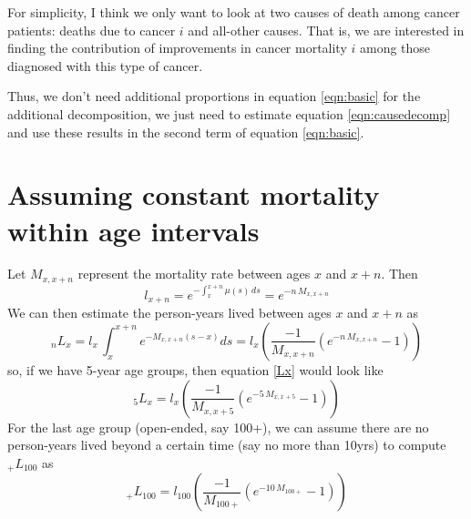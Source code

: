 \documentclass[twoside]{article}
\begin{document}
For simplicity, I think we only want to look at two causes of death among cancer patients: deaths due to cancer $i$ and all-other causes. That is, we are interested in finding the contribution of improvements in cancer mortality $i$ among those diagnosed with this type of cancer.

Thus, we don't need additional proportions in equation \eqref{eqn:basic} for the additional decomposition, we just need to estimate equation \eqref{eqn:causedecomp} and use these results in the second term of equation \eqref{eqn:basic}.


\section{Assuming constant mortality within age intervals}
Let $M_{x,x+n}$ represent the mortality rate between ages $x$ and $x+n$. Then 
\begin{equation}
l_{x+n}=e^{-\int_x^{x+n}\mu(s)\,ds}=e^{-n\,M_{x,x+n}}
\end{equation}
We can then estimate the person-years lived between ages $x$ and $x+n$ as
\begin{equation}
_nL_{x}=l_x\,\int_x^{x+n} e^{-M_{x,x+n}(s-x)} ds=l_x \left(\frac{-1}{M_{x,x+n}}(e^{-n\,M_{x,x+n}}-1) \right)
\label{Lx}
\end{equation}
so, if we have 5-year age groups, then equation \eqref{Lx} would look like
\begin{equation}
_5L_{x}=l_x \left(\frac{-1}{M_{x,x+5}}(e^{-5\,M_{x,x+5}}-1) \right)
\end{equation}
For the last age group (open-ended, say 100+), we can assume there are no person-years lived beyond a certain time (say no more than 10yrs) to compute $_+L_{100}$ as
\begin{equation}
_+L_{100}=l_{100} \left(\frac{-1}{M_{100+}}(e^{-10\,M_{100+}}-1) \right)
\end{equation}
\end{document}
